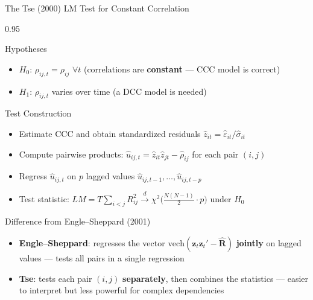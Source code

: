 \documentclass[9pt, aspectratio=169, t]{beamer}
\begin{document}
\begin{frame}{The Tse (2000) LM Test for Constant Correlation}
    \begin{cminipage}{0.95\textwidth}
    \vspace{-3mm}
    {\scriptsize
    \begin{block}{Hypotheses}
        \begin{itemize}\setlength{\itemsep}{0pt}
            \item $H_0$: $\rho_{ij,t} = \rho_{ij}$ $\forall t$ (correlations are \textbf{constant} --- CCC model is correct)
            \item $H_1$: $\rho_{ij,t}$ varies over time (a DCC model is needed)
        \end{itemize}
    \end{block}
    \vspace{-2mm}
    \begin{block}{Test Construction}
        \begin{itemize}\setlength{\itemsep}{0pt}
            \item Estimate CCC and obtain standardized residuals $\hat{z}_{it} = \hat{\varepsilon}_{it}/\hat{\sigma}_{it}$
            \item Compute pairwise products: $\hat{u}_{ij,t} = \hat{z}_{it}\hat{z}_{jt} - \hat{\rho}_{ij}$ for each pair $(i,j)$
            \item Regress $\hat{u}_{ij,t}$ on $p$ lagged values $\hat{u}_{ij,t-1}, \ldots, \hat{u}_{ij,t-p}$
            \item Test statistic: $LM = T \sum_{i<j} R^2_{ij} \xrightarrow{d} \chi^2\big(\frac{N(N-1)}{2} \cdot p\big)$ under $H_0$
        \end{itemize}
    \end{block}
    \vspace{-2mm}
    \begin{alertblock}{Difference from Engle--Sheppard (2001)}
        \begin{itemize}\setlength{\itemsep}{0pt}
            \item \textbf{Engle--Sheppard}: regresses the vector $\text{vech}(\mathbf{z}_t\mathbf{z}_t' - \hat{\mathbf{R}})$ \textbf{jointly} on lagged values --- tests all pairs in a single regression
            \item \textbf{Tse}: tests each pair $(i,j)$ \textbf{separately}, then combines the statistics --- easier to interpret but less powerful for complex dependencies
        \end{itemize}
    \end{alertblock}
    }
    \end{cminipage}
\end{frame}
\end{document}
